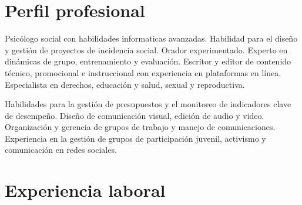 \documentclass[xcolor=svgnames,color=DarkSlateGray,draft=false]{komacv}
\begin{document}
\raggedbottom

\maketitle

\section{Perfil profesional}
\justifying

    Psicólogo social con habilidades informaticas avanzadas. Habilidad para el diseño y gestión de proyectos de incidencia social. Orador experimentado. Experto en dinámicas de grupo, entrenamiento y evaluación. Escritor y editor de contenido técnico, promocional e instruccional con experiencia en plataformas en línea. Especialista en derechos, educación y salud, sexual y reproductiva.


    Habilidades para la gestión de presupuestos y el monitoreo de indicadores clave de desempeño. Diseño de comunicación visual, edición de audio y video. Organización y gerencia de grupos de trabajo y manejo de comunicaciones. Experiencia en la gestión de grupos de participación juvenil, activismo y comunicación en redes sociales.

\section{Experiencia laboral}
\raggedright
\end{document}
